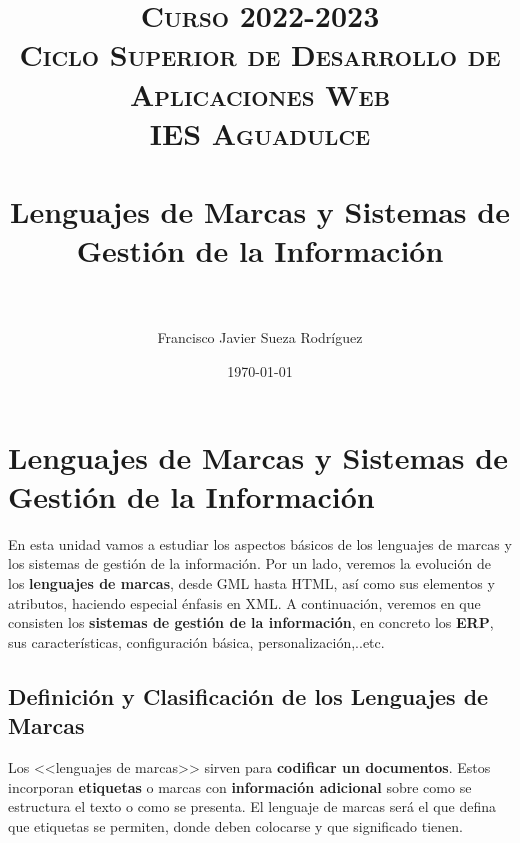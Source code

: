 


\title{
\normalfont \normalsize
\textsc{{\bfseries Curso 2022-2023} \\ Ciclo Superior de Desarrollo de Aplicaciones Web \\ IES Aguadulce} \\ [25pt]
\horrule{0.5pt} \\[0.4cm]
\huge Lenguajes de Marcas y Sistemas de Gestión de la Información\\
\horrule{0.5pt} \\[0.4cm]
}

\author{Francisco Javier Sueza Rodríguez}
\date{\normalsize\today}


\makeglossaries
{}



\maketitle

\newpage

\tableofcontents

\listoffigures


\newpage
\chapter{Lenguajes de Marcas y Sistemas de Gestión de la Información}
En esta unidad vamos a estudiar los aspectos básicos de los lenguajes de marcas y los sistemas de gestión de la información. Por un lado, veremos la evolución de los \textbf{lenguajes de marcas}, desde GML hasta HTML, así como sus elementos y atributos, haciendo especial énfasis en XML. A continuación, veremos en que consisten los \textbf{sistemas de gestión de la información}, en concreto los \textbf{ERP}, sus características, configuración básica, personalización,..etc.

\section{Definición y Clasificación de los Lenguajes de Marcas}
Los <<lenguajes de marcas>> sirven para \textbf{codificar un documentos}. Estos incorporan \textbf{etiquetas} o marcas con \textbf{información adicional} sobre como se estructura el texto o como se presenta. El lenguaje de marcas será el que defina que etiquetas se permiten, donde deben colocarse y que significado tienen.

